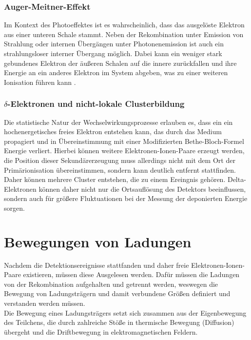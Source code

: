 		\subsubsection{Auger-Meitner-Effekt}
			Im Kontext des Photoeffektes ist es wahrscheinlich, dass das ausgelöste Elektron aus einer unteren Schale stammt. Neben der Rekombination unter Emission von Strahlung oder internen Übergängen unter Photonenemission ist auch ein strahlungsloser interner Übergang möglich. Dabei kann ein weniger stark gebundenes Elektron der äußeren Schalen auf die innere zurückfallen und ihre Energie an ein anderes Elektron im System abgeben, was zu einer weiteren Ionisation führen kann \cite{Sauli_Multiwire}. 
			
		\subsubsection{$\delta$-Elektronen und nicht-lokale Clusterbildung}
			Die statistische Natur der Wechselwirkungsprozesse erlauben es, dass ein ein hochenergetisches freies Elektron entstehen kann, das durch das Medium propagiert und in Übereinstimmung mit einer Modifizierten Bethe-Bloch-Formel \cite{Leo} Energie verliert. Hierbei können weitere Elektronen-Ionen-Paare erzeugt werden, die Position dieser Sekundärerzeugung muss allerdings nicht mit dem Ort der Primärionisation übereinstimmen, sondern kann deutlich entfernt stattfinden. Daher können mehrere Cluster entstehen, die zu einem Ereingnis gehören. Delta-Elektronen können daher nicht nur die Ortsauflösung des Detektors beeinflussen, sondern auch für größere Fluktuationen bei der Messung der deponierten Energie sorgen.
			
		\newpage	
		
	\section{Bewegungen von Ladungen}		
	Nachdem die Detektionsereignisse stattfanden und daher freie Elektronen-Ionen-Paare existieren, müssen diese Ausgelesen werden. Dafür müssen die Ladungen von der Rekombination aufgehalten und getrennt werden, weswegen die Bewegung von Ladungsträgern und damit verbundene Größen definiert und verstanden werden müssen.\\
	Die Bewegung eines Ladungsträgers setzt sich zusammen aus der Eigenbewegung des Teilchens, die durch zahlreiche Stöße in thermische Bewegung (Diffusion) übergeht und die Driftbewegung in elektromagnetischen Feldern.
	
